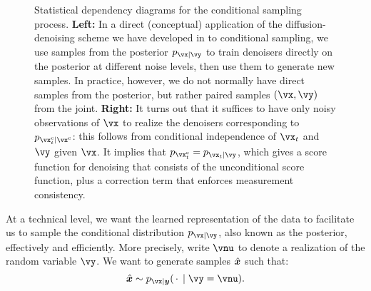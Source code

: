 \documentclass[../../book-main.tex]{subfiles}
\begin{document}
\begin{figure}[t]
  \centering
  \begin{subfigure}{0.45\textwidth}
    \vspace{0.75cm}
    \centering
    \vspace{0.75cm}
    \caption{}
    \label{fig:left}
  \end{subfigure}
  \hfill
  \begin{subfigure}{0.45\textwidth}
    \centering
    \caption{}
    \label{fig:right}
  \end{subfigure}
  \caption{Statistical dependency diagrams for the conditional sampling process.
  \textbf{Left:} In a direct (conceptual) application of the diffusion-denoising scheme
  we have developed in  to conditional sampling, we use
  samples from the posterior $p_{\vx \mid \vy}$ to train denoisers directly on
  the posterior at different noise levels, then use them to generate new
  samples. In practice, however, we do not normally have direct samples from the
  posterior, but rather paired samples $(\vx, \vy)$ from the joint.
  \textbf{Right:} It turns out that it suffices to have only noisy observations
  of $\vx$ to realize the denoisers corresponding to $p_{\posteriorsample_t \mid
  \posteriorsample}$: this follows from conditional independence of $\vx_t$ and
  $\vy$ given $\vx$. It implies that $p_{\posteriorsample_t} = p_{\vx_t \mid
  \vy}$, which gives a score function for denoising that consists of the
  unconditional score function, plus a correction term that enforces measurement
  consistency.}
  \label{fig:posterior-sampling-cds}
\end{figure}


At a technical level, we want the learned representation of the data
to facilitate us to sample the conditional distribution $p_{\vx\mid
\vy}$, also known as the posterior, effectively and efficiently. More precisely,
write $\vnu$ to denote a realization of the random variable $\vy$.
We want to generate samples $\hat{\bm{x}}$ such that:
\begin{equation}\label{eq:goal-sample-posterior}
  \hat{\x} \sim   p_{\vx \mid \y}(\spcdot \mid \vy=\vnu).
\end{equation}
\end{document}
